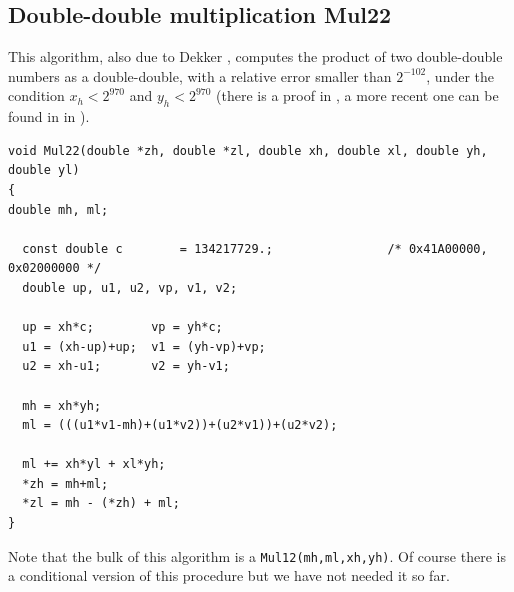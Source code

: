 \subsection{Double-double multiplication {Mul22}}
  
This algorithm, also due to Dekker \cite{Dek71}, computes the product of
two double-double numbers as a double-double, with a relative error
smaller than $2^{-102}$, under the condition $x_h<2^{970}$ and $y_h<2^{970}$  (there is a proof in \cite{Dek71}, a more recent one can be found in in \cite{Lauter2005LIP:tripledouble}). 

\begin{lstlisting}[label={Mul22},caption={Mul22},firstnumber=1]
void Mul22(double *zh, double *zl, double xh, double xl, double yh, double yl)
{
double mh, ml;

  const double c        = 134217729.;                /* 0x41A00000, 0x02000000 */ 
  double up, u1, u2, vp, v1, v2;

  up = xh*c;        vp = yh*c;
  u1 = (xh-up)+up;  v1 = (yh-vp)+vp;
  u2 = xh-u1;       v2 = yh-v1;
  
  mh = xh*yh;
  ml = (((u1*v1-mh)+(u1*v2))+(u2*v1))+(u2*v2);

  ml += xh*yl + xl*yh;
  *zh = mh+ml;
  *zl = mh - (*zh) + ml;
}  
\end{lstlisting}

Note that the bulk of this algorithm is a \texttt{Mul12(mh,ml,xh,yh)}.
Of course there is a conditional version of this procedure but we have not needed it so far.



